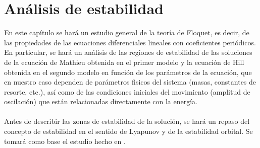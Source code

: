 \chapter{Análisis de estabilidad}
En este capítulo se hará un estudio general de la teoría de Floquet, es decir, de las propiedades de las ecuaciones diferenciales lineales con coeficientes periódicos. En particular, se hará un análisis de las regiones de estabilidad de las soluciones de la ecuación de Mathieu obtenida en el primer modelo y la ecuación de Hill obtenida en el segundo modelo en función de los parámetros de la ecuación, que en nuestro caso dependen de parámetros fisicos del sistema (masas, constantes de resorte, etc.), así como de las condiciones iniciales del movimiento (amplitud de oscilación) que están relacionadas directamente con la energía.
\\
\\
Antes de describir las zonas de estabilidad de la solución, se hará un repaso del concepto de estabilidad en el sentido de Lyapunov y de la estabilidad orbital. Se tomará como base el estudio hecho en \citep{ortega}.
